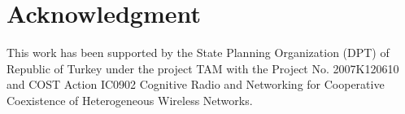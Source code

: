 \documentclass[conference,compsoc]{IEEEtran}
\begin{document}
\section*{Acknowledgment}
This work has been supported by the State Planning Organization (DPT) of Republic of Turkey under the project TAM with the Project No. 2007K120610 and COST Action IC0902 Cognitive Radio and Networking for Cooperative Coexistence of Heterogeneous Wireless Networks.




\end{document}
